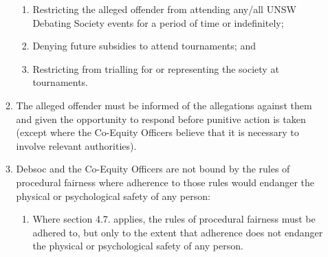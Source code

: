\begin{enumerate}
\begin{enumerate}
    \begin{enumerate}
    \item Restricting the alleged offender from attending any/all UNSW Debating Society events for a period of time or indefinitely;
    \item Denying future subsidies to attend tournaments; and
    \item Restricting from trialling for or representing the society at tournaments.
    \end{enumerate}
  \item The alleged offender must be informed of the allegations against them and given the opportunity to respond before punitive action is taken (except where the Co-Equity Officers believe that it is necessary to involve relevant authorities).
  \item Debsoc and the Co-Equity Officers are not bound by the rules of procedural fairness where adherence to those rules would endanger the physical or psychological safety of any person:
    \begin{enumerate}
    \item Where section 4.7. applies, the rules of procedural fairness must be adhered to, but only to the extent that adherence does not endanger the physical or psychological safety of any person.
    \end{enumerate}
  \end{enumerate}
\end{enumerate}
